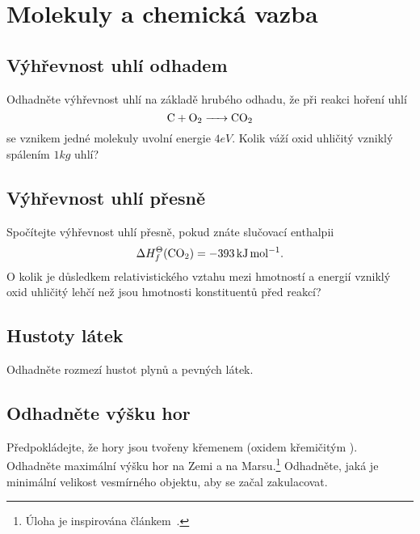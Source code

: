 \section{Molekuly a chemická vazba}
    \subsection{Výhřevnost uhlí odhadem}
        Odhadněte výhřevnost uhlí na základě hrubého odhadu, že při reakci hoření uhlí
        \begin{equation}
            \ce{C + O2 -> CO2}
        \end{equation}
        se vznikem jedné molekuly uvolní energie $4\unit{eV}$.
        Kolik váží oxid uhličitý vzniklý spálením $1\unit{kg}$ uhlí?

    \subsection{Výhřevnost uhlí přesně}
        Spočítejte výhřevnost uhlí přesně, pokud znáte slučovací enthalpii
        \begin{equation}
            \Delta H_{f}^{\Theta}(\ce{CO2})=-393\unit{kJ}\unit{mol^{-1}}.
        \end{equation}
        O kolik je důsledkem relativistického vztahu mezi hmotností a energií vzniklý oxid uhličitý lehčí než jsou hmotnosti konstituentů před reakcí?

    \subsection{Hustoty látek}
        Odhadněte rozmezí hustot plynů a pevných látek.

    \subsection{Odhadněte výšku hor}
        Předpokládejte, že hory jsou tvořeny křemenem (oxidem křemičitým ).
        Odhadněte maximální výšku hor na Zemi a na Marsu.\footnote{Úloha je inspirována článkem~\cite{Weisskopf1975}.}
        Odhadněte, jaká je minimální velikost vesmírného objektu, aby se začal zakulacovat.